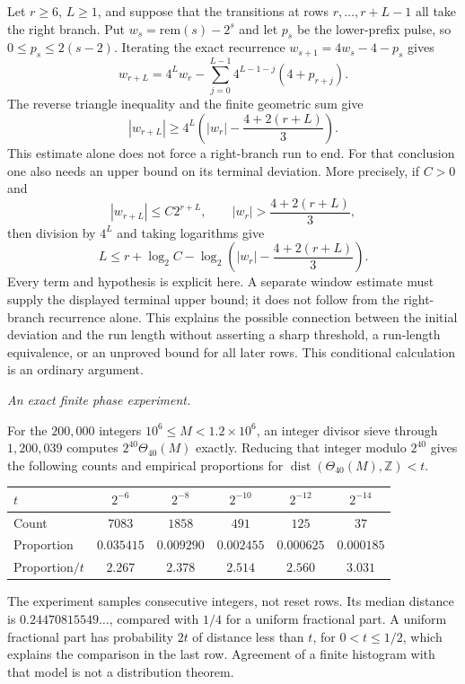 Let $r\ge6$, $L\ge1$, and suppose that the transitions at rows
$r,\ldots,r+L-1$ all take the right branch.  Put
$w_s=\mathrm{rem}(s)-2^s$ and let $p_s$ be the lower-prefix
pulse, so $0\le p_s\le2(s-2)$.  Iterating the exact recurrence
$w_{s+1}=4w_s-4-p_s$ gives
\[
 w_{r+L}=4^Lw_r-
       \sum_{j=0}^{L-1}4^{L-1-j}(4+p_{r+j}).
\]
The reverse triangle inequality and the finite geometric sum give
\[
 |w_{r+L}|
 \ge4^L\left(|w_r|-\frac{4+2(r+L)}3\right).
\]
This estimate alone does not force a right-branch run to end.
For that conclusion one also needs an upper bound on its terminal
deviation.  More precisely, if $C>0$ and
\[
 |w_{r+L}|\le C2^{r+L},\qquad
 |w_r|>\frac{4+2(r+L)}3,
\]
then division by $4^L$ and taking logarithms give
\[
 L\le r+\log_2 C-
 \log_2\left(|w_r|-\frac{4+2(r+L)}3\right).
\]
Every term and hypothesis is explicit here.  A separate window
estimate must supply the displayed terminal upper bound; it does
not follow from the right-branch recurrence alone.  This explains
the possible connection between the initial deviation and the
run length without asserting a sharp threshold, a run-length
equivalence, or an unproved bound for all later rows.  This conditional
calculation is an ordinary argument.

\emph{An exact finite phase experiment.}

For the $200{,}000$ integers $10^6\le M<1.2\times10^6$, an
integer divisor sieve through $1{,}200{,}039$ computes
$2^{40}\Theta_{40}(M)$ exactly.  Reducing that integer modulo
$2^{40}$ gives the following counts and empirical proportions for
$\operatorname{dist}(\Theta_{40}(M),\mathbb Z)<t$.
\begin{center}
\begin{tabular}{lccccc}
\hline
$t$ & $2^{-6}$ & $2^{-8}$ & $2^{-10}$ & $2^{-12}$ & $2^{-14}$\\
\hline
Count & $7083$ & $1858$ & $491$ & $125$ & $37$\\
Proportion & $0.035415$ & $0.009290$ & $0.002455$ & $0.000625$ & $0.000185$\\
Proportion$/t$ & $2.267$ & $2.378$ & $2.514$ & $2.560$ & $3.031$\\
\hline
\end{tabular}
\end{center}
The experiment samples consecutive integers, not reset rows.  Its median distance
is $0.24470815549\ldots$, compared with $1/4$ for a uniform
fractional part.  A uniform fractional part has probability $2t$
of distance less than $t$, for $0<t\le1/2$, which explains the
comparison in the last row.  Agreement of a finite histogram with
that model is not a distribution theorem.

